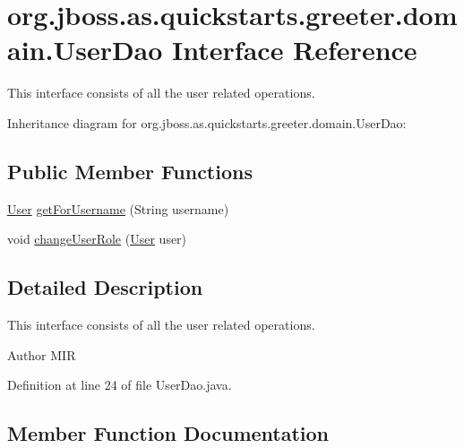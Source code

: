 \hypertarget{interfaceorg_1_1jboss_1_1as_1_1quickstarts_1_1greeter_1_1domain_1_1_user_dao}{}\section{org.\+jboss.\+as.\+quickstarts.\+greeter.\+domain.\+User\+Dao Interface Reference}
\label{interfaceorg_1_1jboss_1_1as_1_1quickstarts_1_1greeter_1_1domain_1_1_user_dao}


This interface consists of all the user related operations.  




Inheritance diagram for org.\+jboss.\+as.\+quickstarts.\+greeter.\+domain.\+User\+Dao\+:
\subsection*{Public Member Functions}
\begin{DoxyCompactItemize}
\item 
\hyperlink{classorg_1_1jboss_1_1as_1_1quickstarts_1_1greeter_1_1domain_1_1_user}{User} \hyperlink{interfaceorg_1_1jboss_1_1as_1_1quickstarts_1_1greeter_1_1domain_1_1_user_dao_a84aa70bdb1523236fcc24d2cd8b02b9f}{get\+For\+Username} (String username)
\item 
void \hyperlink{interfaceorg_1_1jboss_1_1as_1_1quickstarts_1_1greeter_1_1domain_1_1_user_dao_af4383d2e7155cdc6ad486cb55ff5915d}{change\+User\+Role} (\hyperlink{classorg_1_1jboss_1_1as_1_1quickstarts_1_1greeter_1_1domain_1_1_user}{User} user)
\end{DoxyCompactItemize}


\subsection{Detailed Description}
This interface consists of all the user related operations. 

\begin{DoxyAuthor}{Author}
M\+IR 
\end{DoxyAuthor}


Definition at line 24 of file User\+Dao.\+java.



\subsection{Member Function Documentation}
\mbox{\label{interfaceorg_1_1jboss_1_1as_1_1quickstarts_1_1greeter_1_1domain_1_1_user_dao_af4383d2e7155cdc6ad486cb55ff5915d}} 
